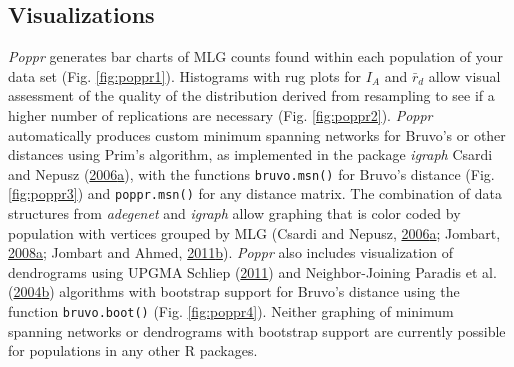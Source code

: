 \documentclass[double,12pt]{beavtex}
\begin{document}
  \subsection{Visualizations}\label{visualizations}
  
  \emph{Poppr} generates bar charts of MLG counts found within each
  population of your data set (Fig. \ref{fig:poppr1}). Histograms with rug
  plots for \(I_A\) and \(\bar{r}_d\) allow visual assessment of the
  quality of the distribution derived from resampling to see if a higher
  number of replications are necessary (Fig. \ref{fig:poppr2}).
  \emph{Poppr} automatically produces custom minimum spanning networks for
  Bruvo's or other distances using Prim's algorithm, as implemented in the
  package \emph{igraph} Csardi and Nepusz
  (\protect\hyperlink{ref-igraph}{2006}\protect\hyperlink{ref-igraph}{a}),
  with the functions \texttt{bruvo.msn()} for Bruvo's distance (Fig.
  \ref{fig:poppr3}) and \texttt{poppr.msn()} for any distance matrix. The
  combination of data structures from \emph{adegenet} and \emph{igraph}
  allow graphing that is color coded by population with vertices grouped
  by MLG (Csardi and Nepusz,
  \protect\hyperlink{ref-igraph}{2006}\protect\hyperlink{ref-igraph}{a};
  Jombart,
  \protect\hyperlink{ref-Jombart:2008}{2008}\protect\hyperlink{ref-Jombart:2008}{a};
  Jombart and Ahmed,
  \protect\hyperlink{ref-Jombart:2011}{2011}\protect\hyperlink{ref-Jombart:2011}{b}).
  \emph{Poppr} also includes visualization of dendrograms using UPGMA
  Schliep (\protect\hyperlink{ref-phangorn}{2011}) and Neighbor-Joining
  Paradis et al.
  (\protect\hyperlink{ref-ape}{2004}\protect\hyperlink{ref-ape}{b})
  algorithms with bootstrap support for Bruvo's distance using the
  function \texttt{bruvo.boot()} (Fig. \ref{fig:poppr4}). Neither graphing
  of minimum spanning networks or dendrograms with bootstrap support are
  currently possible for populations in any other R packages.
  
\end{document}

